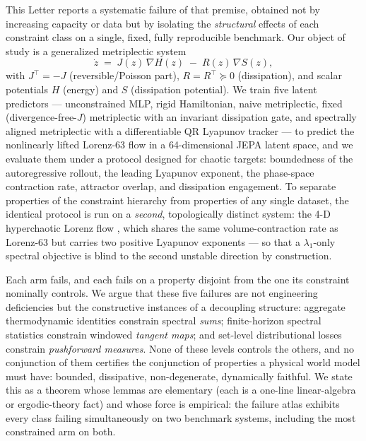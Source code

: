 \documentclass[11pt]{article}
\newcommand{\grad}{\nabla}
\begin{document}
This Letter reports a systematic failure of that premise, obtained not by
increasing capacity or data but by isolating the \emph{structural} effects
of each constraint class on a single, fixed, fully reproducible benchmark.
Our object of study is a generalized metriplectic system
\begin{equation}
\label{eq:metriplectic}
\dot z \;=\; J(z)\,\grad H(z) \;-\; R(z)\,\grad S(z),
\end{equation}
with $J^\top=-J$ (reversible/Poisson part), $R=R^\top\succeq 0$
(dissipation), and scalar potentials $H$ (energy) and $S$ (dissipation
potential). We train five latent predictors --- unconstrained MLP,
rigid Hamiltonian, naive metriplectic, fixed (divergence-free-$J$)
metriplectic with an invariant dissipation gate, and spectrally aligned
metriplectic with a differentiable QR Lyapunov tracker --- to predict the
nonlinearly lifted Lorenz-63 flow in a 64-dimensional JEPA latent space,
and we evaluate them under a protocol designed for chaotic targets:
boundedness of the autoregressive rollout, the leading Lyapunov exponent,
the phase-space contraction rate, attractor overlap, and dissipation
engagement. To separate properties of the constraint hierarchy from
properties of any single dataset, the identical protocol is run on a
\emph{second}, topologically distinct system: the 4-D hyperchaotic
Lorenz flow \cite{qi2008hyperchaos}, which shares the same
volume-contraction rate as Lorenz-63 but carries two positive Lyapunov
exponents --- so that a $\lambda_1$-only spectral objective is blind to
the second unstable direction by construction.

Each arm fails, and each fails on a property disjoint from the one its
constraint nominally controls. We argue that these five failures are not
engineering deficiencies but the constructive instances of a decoupling
structure: aggregate thermodynamic identities constrain spectral
\emph{sums}; finite-horizon spectral statistics constrain windowed
\emph{tangent maps}; and set-level distributional losses constrain
\emph{pushforward measures}. None of these levels controls the others,
and no conjunction of them certifies the conjunction of properties a
physical world model must have: {bounded, dissipative, non-degenerate,
dynamically faithful}. We state this as a theorem whose lemmas are
elementary (each is a one-line linear-algebra or ergodic-theory fact) and
whose force is empirical: the failure atlas exhibits every class failing
simultaneously on two benchmark systems, including the most constrained
arm on both.
\end{document}
